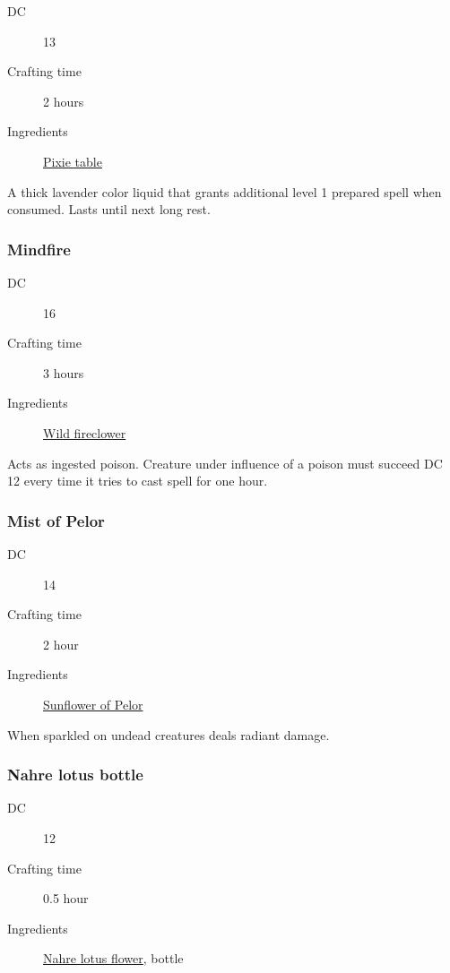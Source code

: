 \begin{description}
\item [DC] 13 \arcana
\item [Crafting time] 2 hours
\item [Ingredients] \hyperref[Pixie table]{Pixie table}
\end{description}

A thick lavender color liquid that grants additional level 1 prepared spell when consumed. Lasts until next long rest.

\subsubsection{Mindfire}
\label{Mindfire}

\begin{description}
\item [DC] 16 \nature
\item [Crafting time] 3 hours
\item [Ingredients] \hyperref[Wild Fireclover]{Wild fireclower}
\end{description}

Acts as ingested poison. Creature under influence of a poison must succeed DC 12 \wisdomsave every time it tries to cast spell for one hour.

\subsubsection{Mist of Pelor}
\label{Mist of Pelor}

\begin{description}
\item [DC] 14 \religion
\item [Crafting time] 2 hour
\item [Ingredients] \hyperref[Sunflower of Pelor]{Sunflower of Pelor}
\end{description}

When sparkled on undead creatures deals  radiant damage.

\subsubsection{Nahre lotus bottle}
\label{Nahre lotus bottle}

\begin{description}
\item [DC] 12 \arcana
\item [Crafting time] 0.5 hour
\item [Ingredients] \hyperref[Nahre Lotus]{Nahre lotus flower}, bottle
\end{description}

